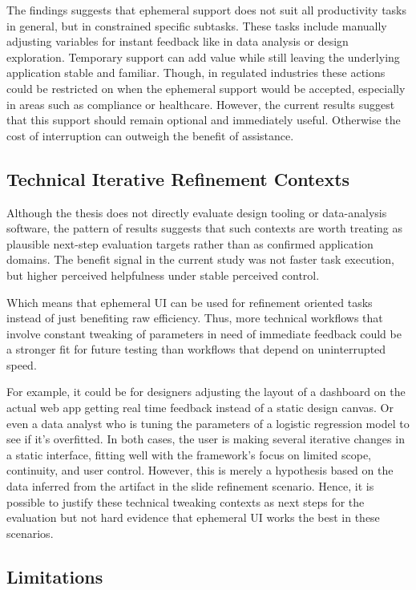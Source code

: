 The findings suggests that ephemeral support does not suit all productivity tasks in general, but in constrained specific subtasks. These tasks include manually adjusting variables for instant feedback like in data analysis or design exploration. Temporary support can add value while still leaving the underlying application stable and familiar. Though, in regulated industries these actions could be restricted on when the ephemeral support would be accepted, especially in areas such as compliance or healthcare. However, the current results suggest that this support should remain optional and immediately useful. Otherwise the cost of interruption can outweigh the benefit of assistance.

\subsection{Technical Iterative Refinement Contexts}

Although the thesis does not directly evaluate design tooling or data-analysis software, the pattern of results suggests that such contexts are worth treating as plausible next-step evaluation targets rather than as confirmed application domains. The benefit signal in the current study was not faster task execution, but higher perceived helpfulness under stable perceived control. 

Which means that ephemeral UI can be used for refinement oriented tasks instead of just benefiting raw efficiency. Thus, more technical workflows that involve constant tweaking of parameters in need of immediate feedback could be a stronger fit for future testing than workflows that depend on uninterrupted speed.


For example, it could be for designers adjusting the layout of a dashboard on the actual web app getting real time feedback instead of a static design canvas. Or even a data analyst who is tuning the parameters of a logistic regression model to see if it's overfitted. In both cases, the user is making several iterative changes in a static interface, fitting well with the framework's focus on limited scope, continuity, and user control. However, this is merely a hypothesis based on the data inferred from the artifact in the slide refinement scenario. Hence, it is possible to justify these technical tweaking contexts as next steps for the evaluation but not hard evidence that ephemeral UI works the best in these scenarios.

\subsection{Limitations}

